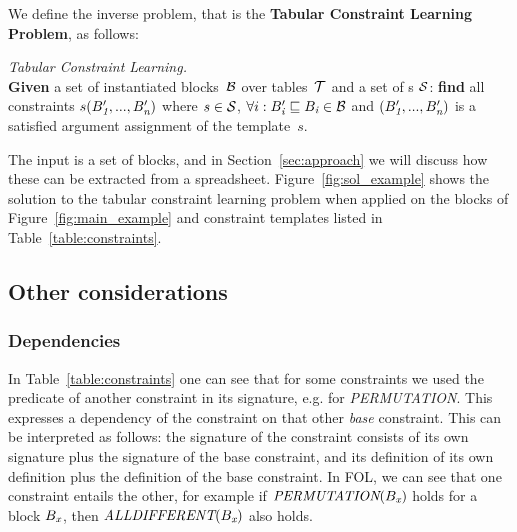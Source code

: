 We define the inverse problem, that is the {\bf Tabular Constraint Learning Problem}, as follows:
%
\begin{definition} \textit{Tabular Constraint Learning.}\label{def:problem_statement}\\
{\bf Given} a set of instantiated blocks~${\cal B}$ over tables~${\cal T}$ and a set of {\template}s ${\cal S}$: {\bf find} all constraints $s(B'_{\textit{1}}, ..., B'_{\textit{n}})$ where $s \in {\cal S}$, $\forall i: \sbl{i}' \sqsubseteq \sbl{i} \in {\cal B}$ and $(B'_{\textit{1}}, ..., B'_{\textit{n}})$ is a satisfied argument assignment of the template~$s$.
\end{definition}


The input is a set of blocks, and in Section~\ref{sec:approach} we will discuss how these can be extracted from a spreadsheet.
Figure~\ref{fig:sol_example} shows the solution to the tabular constraint learning problem when applied on the blocks of Figure~\ref{fig:main_example} and constraint templates listed in Table~\ref{table:constraints}.

\subsection{Other considerations}

\subsubsection{Dependencies}
\label{sec:form:dependencies}
In Table~\ref{table:constraints} one can see that for some constraints we used the predicate of another constraint in its signature, e.g. for \textit{PERMUTATION}.
This expresses a dependency of the constraint on that other \textit{base} constraint.
This can be interpreted as follows: the signature of the constraint consists of its own signature plus the signature of the base constraint, and its definition of its own definition plus the definition of the base constraint.
In FOL, we can see that one constraint entails the other, for example if $\textit{PERMUTATION}(B_{\textit{x}})$ holds for a block $B_{\textit{x}}$, then $\textit{ALLDIFFERENT}(B_{\textit{x}})$ also holds.

